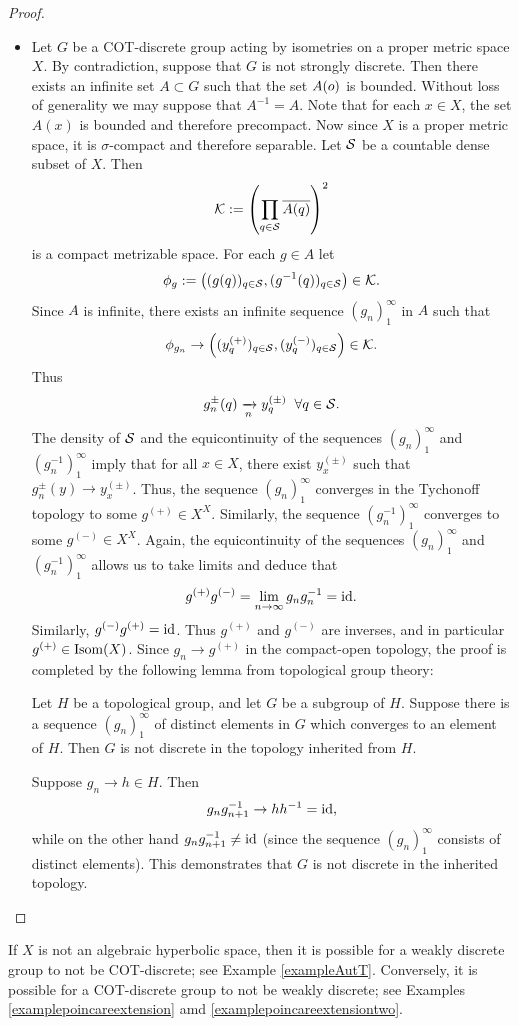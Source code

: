 \begin{proof}
\begin{itemize}
\item[(iii)]
Let $G$ be a COT-discrete group acting by isometries on a proper metric space $X$. By contradiction, suppose that $G$ is not strongly discrete. Then there exists an infinite set $A\subset G$ such that the set $A(o)$ is bounded. Without loss of generality we may suppose that $A^{-1} = A$. Note that for each $x\in X$, the set $A(x)$ is bounded and therefore precompact. Now since $X$ is a proper metric space, it is $\sigma$-compact and therefore separable. Let $\mathcal S$ be a countable dense subset of $X$. Then
\[
\mathcal K := \left(\prod_{q\in\mathcal S}\overline{A(q)}\right)^2
\]
is a compact metrizable space. For each $g\in A$ let
\[
\phi_g := \left((g(q))_{q\in\mathcal S},(g^{-1}(q))_{q\in\mathcal S}\right)\in \mathcal K.
\]
Since $A$ is infinite, there exists an infinite sequence $(g_n)_1^\infty$ in $A$ such that
\[
\phi_{g_n}\to \left((y_q^{(+)})_{q\in\mathcal S},(y_q^{(-)})_{q\in\mathcal S}\right)\in\mathcal K.
\]
Thus
\[
g_n^\pm(q) \xrightarrow[n]{} y_q^{(\pm)} \;\;\forall q\in\mathcal S.
\]
The density of $\mathcal S$ and the equicontinuity of the sequences $(g_n)_1^\infty$ and $(g_n^{-1})_1^\infty$ imply that for all $x\in X$, there exist $y_x^{(\pm)}$ such that $g_n^\pm(y)\to y_x^{(\pm)}$. Thus, the sequence $(g_n)_1^\infty$ converges in the Tychonoff topology to some $g^{(+)}\in X^X$. Similarly, the sequence $(g_n^{-1})_1^\infty$ converges to some $g^{(-)}\in X^X$. Again, the equicontinuity of the sequences $(g_n)_1^\infty$ and $(g_n^{-1})_1^\infty$ allows us to take limits and deduce that
\[
g^{(+)} g^{(-)} = \lim_{n\to\infty} g_n g_n^{-1} = \mathrm{id}.
\]
Similarly, $g^{(-)}g^{(+)} = \mathrm{id}$. Thus $g^{(+)}$ and $g^{(-)}$ are inverses, and in particular $g^{(+)}\in\operatorname{Isom}(X)$. Since $g_n\to g^{(+)}$ in the compact-open topology, the proof is completed by the following lemma from topological group theory:
\begin{lemma}
\label{lemmadiscretesubgroup}
Let $H$ be a topological group, and let $G$ be a subgroup of $H$. Suppose there is a sequence $(g_n)_1^\infty$ of distinct elements in $G$ which converges to an element of $H$. Then $G$ is not discrete in the topology inherited from $H$.
\end{lemma}
\begin{subproof}
Suppose $g_n\to h\in H$. Then
\[
g_n g_{n + 1}^{-1} \to h h^{-1} = \mathrm{id},
\]
while on the other hand $g_n g_{n + 1}^{-1}\neq \mathrm{id}$ (since the sequence $(g_n)_1^\infty$ consists of distinct elements). This demonstrates that $G$ is not discrete in the inherited topology.
\end{subproof}
\end{itemize}
\end{proof}
If $X$ is not an algebraic hyperbolic space, then it is possible for a weakly discrete group to not be COT-discrete; see Example \ref{exampleAutT}. Conversely, it is possible for a COT-discrete group to not be weakly discrete; see Examples \ref{examplepoincareextension} amd \ref{examplepoincareextensiontwo}.

